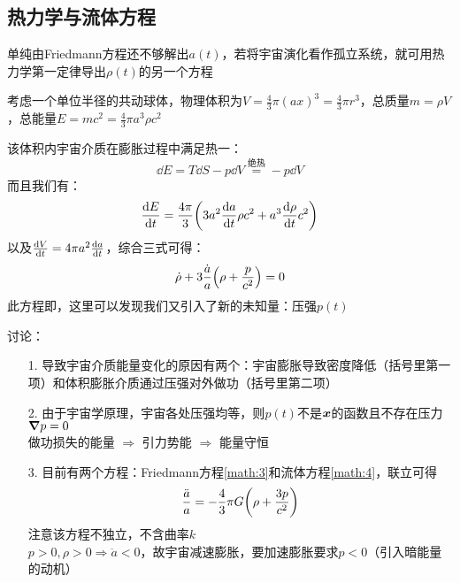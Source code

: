 \subsection{热力学与流体方程}
\par 
单纯由Friedmann方程还不够解出$a(t)$，若将宇宙演化看作孤立系统，就可用热力学第一定律导出$\rho(t)$的另一个方程
\par 
考虑一个单位半径的共动球体，物理体积为$V = \frac{4}{3} \pi (ax)^3 = \frac{4}{3} \pi r^3$，总质量$m = \rho V$，总能量$E = m c^2 = \frac{4}{3} \pi a^3 \rho c^2$
\par 
该体积内宇宙介质在膨胀过程中满足热一：
\begin{equation}
	\dd E = T \dd S - p \dd V \overset{绝热}{=} - p \dd V 
\end{equation} 
而且我们有：
\begin{equation}
	\dv{E}{t} = \frac{4 \pi}{3} \qty(3 a^2 \dv{a}{t} \rho c^2 + a^3 \dv{\rho}{t} c^2 )
\end{equation}
以及$\dv{V}{t} = 4 \pi a^2 \dv{a}{t}$，综合三式可得：
\begin{equation}
	\dot{\rho} + 3 \frac{\dot{a}}{a} \qty(\rho + \frac{p}{c^2}) = 0
	\label{math:4}
\end{equation}
此方程即，这里可以发现我们又引入了新的未知量：压强$p(t)$
\par 
讨论：
\begin{itemize}
	\item[1. ] 导致宇宙介质能量变化的原因有两个：宇宙膨胀导致密度降低（括号里第一项）和体积膨胀介质通过压强对外做功（括号里第二项）
	\item[2. ] 由于宇宙学原理，宇宙各处压强均等，则$p(t)$不是$\vb*{x}$的函数且不存在压力$\grad{p} = 0$ \\
	做功损失的能量 $\Rightarrow$ 引力势能 $\Rightarrow$ 能量守恒
	\item[3. ] 目前有两个方程：Friedmann方程\eqref{math:3}和流体方程\eqref{math:4}，联立可得
	\begin{equation}
		\frac{\ddot{a}}{a} = - \frac{4}{3} \pi G \qty(\rho + \frac{3p}{c^2})
		\label{math:6}
	\end{equation}
	注意该方程不独立，不含曲率$k$ \\
	$p>0, \rho >0 \Rightarrow \ddot{a} < 0$，故宇宙减速膨胀，要加速膨胀要求$p<0$（引入暗能量的动机）
\end{itemize}


